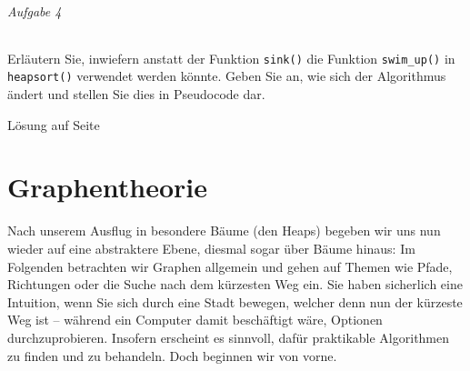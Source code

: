 \documentclass[11pt,a4paper]{scrartcl}
\begin{document}
\paragraph{Aufgabe 4}
Erläutern Sie, inwiefern anstatt der Funktion \texttt{sink()} die Funktion \texttt{swim{\_}up()} in \texttt{heapsort()} verwendet werden könnte. Geben Sie an, wie sich der Algorithmus ändert und stellen Sie dies in Pseudocode dar.
\begin{flushright}
Lösung auf Seite \pageref{a5.4:lsg}
\end{flushright}
\pagebreak
\part{Graphentheorie}
Nach unserem Ausflug in besondere Bäume (den Heaps) begeben wir uns nun wieder auf eine abstraktere Ebene, diesmal sogar über Bäume hinaus: Im Folgenden betrachten wir Graphen allgemein und gehen auf Themen wie Pfade, Richtungen oder die Suche nach dem kürzesten Weg ein. Sie haben sicherlich eine Intuition, wenn Sie sich durch eine Stadt bewegen, welcher denn nun der kürzeste Weg ist -- während ein Computer damit beschäftigt wäre, Optionen durchzuprobieren. Insofern erscheint es sinnvoll, dafür praktikable Algorithmen zu finden und zu behandeln.
Doch beginnen wir von vorne. 
\end{document}

